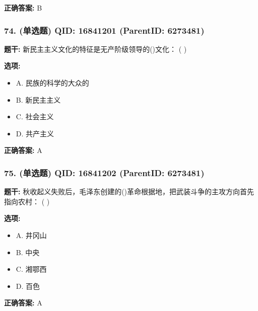 \documentclass[12pt,UTF8]{ctexart}
\begin{document}
\textbf{正确答案:}
B

\vspace{0.3em}\hrulefill\vspace{0.7em}

\subsubsection*{74. (单选题) \small QID: 16841201 (ParentID: 6273481)}

\textbf{题干:}
新民主主义文化的特征是无产阶级领导的()文化： ( )



\textbf{选项:}
\begin{itemize}[leftmargin=*]

  \item A. 民族的科学的大众的

  \item B. 新民主主义

  \item C. 社会主义

  \item D. 共产主义

\end{itemize}

\textbf{正确答案:}
A

\vspace{0.3em}\hrulefill\vspace{0.7em}

\subsubsection*{75. (单选题) \small QID: 16841202 (ParentID: 6273481)}

\textbf{题干:}
秋收起义失败后，毛泽东创建的()革命根据地，把武装斗争的主攻方向首先指向农村： ( )



\textbf{选项:}
\begin{itemize}[leftmargin=*]

  \item A. 井冈山

  \item B. 中央

  \item C. 湘鄂西

  \item D. 百色

\end{itemize}

\textbf{正确答案:}
A
\end{document}
